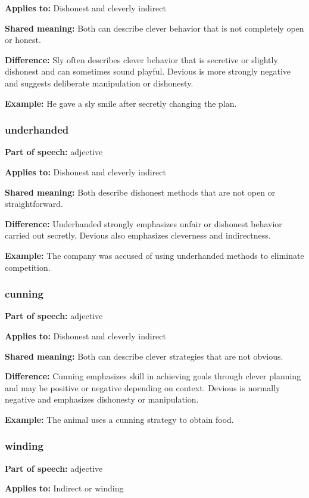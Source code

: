 \documentclass[11pt]{article}
\begin{document}
\textbf{Applies to:} Dishonest and cleverly indirect

\textbf{Shared meaning:} Both can describe clever behavior that is not completely open or honest.

\textbf{Difference:} Sly often describes clever behavior that is secretive or slightly dishonest and can sometimes sound playful. Devious is more strongly negative and suggests deliberate manipulation or dishonesty.

\textbf{Example:} He gave a sly smile after secretly changing the plan.

\subsubsection{underhanded}
\textbf{Part of speech:} adjective

\textbf{Applies to:} Dishonest and cleverly indirect

\textbf{Shared meaning:} Both describe dishonest methods that are not open or straightforward.

\textbf{Difference:} Underhanded strongly emphasizes unfair or dishonest behavior carried out secretly. Devious also emphasizes cleverness and indirectness.

\textbf{Example:} The company was accused of using underhanded methods to eliminate competition.

\subsubsection{cunning}
\textbf{Part of speech:} adjective

\textbf{Applies to:} Dishonest and cleverly indirect

\textbf{Shared meaning:} Both can describe clever strategies that are not obvious.

\textbf{Difference:} Cunning emphasizes skill in achieving goals through clever planning and may be positive or negative depending on context. Devious is normally negative and emphasizes dishonesty or manipulation.

\textbf{Example:} The animal uses a cunning strategy to obtain food.

\subsubsection{winding}
\textbf{Part of speech:} adjective

\textbf{Applies to:} Indirect or winding
\end{document}
